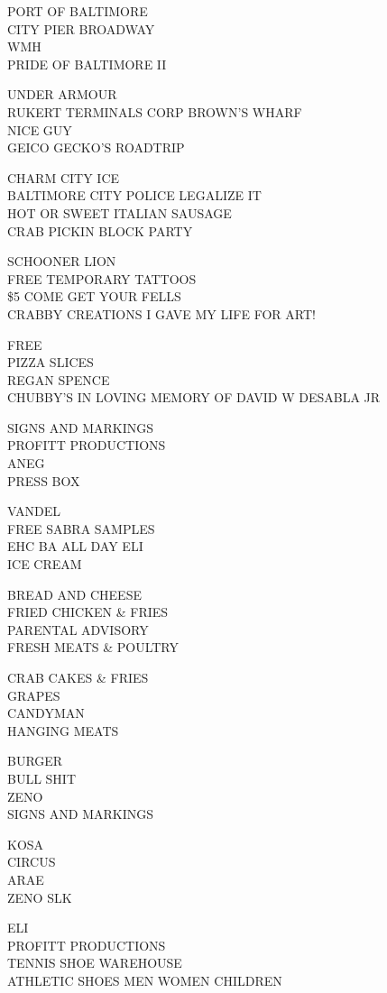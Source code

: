 \documentclass[10pt,letterpaper]{article}
\begin{document}
PORT OF BALTIMORE\\
CITY PIER BROADWAY\\
WMH\\
PRIDE OF BALTIMORE II

UNDER ARMOUR\\
RUKERT TERMINALS CORP BROWN'S WHARF\\
NICE GUY\\
GEICO GECKO'S ROADTRIP

CHARM CITY ICE\\
BALTIMORE CITY POLICE LEGALIZE IT\\
HOT OR SWEET ITALIAN SAUSAGE\\
CRAB PICKIN BLOCK PARTY

SCHOONER LION\\
FREE TEMPORARY TATTOOS\\
\$5 COME GET YOUR FELLS\\
CRABBY CREATIONS I GAVE MY LIFE FOR ART!

FREE\\
PIZZA SLICES\\
REGAN SPENCE\\
CHUBBY'S IN LOVING MEMORY OF DAVID W DESABLA JR

SIGNS AND MARKINGS\\
PROFITT PRODUCTIONS\\
ANEG\\
PRESS BOX

VANDEL\\
FREE SABRA SAMPLES\\
EHC BA ALL DAY ELI\\
ICE CREAM

BREAD AND CHEESE\\
FRIED CHICKEN \& FRIES\\
PARENTAL ADVISORY\\
FRESH MEATS \& POULTRY

CRAB CAKES \& FRIES\\
GRAPES\\
CANDYMAN\\
HANGING MEATS

BURGER\\
BULL SHIT\\
ZENO\\
SIGNS AND MARKINGS

KOSA\\
CIRCUS\\
ARAE\\
ZENO SLK

ELI\\
PROFITT PRODUCTIONS\\
TENNIS SHOE WAREHOUSE\\
ATHLETIC SHOES MEN WOMEN CHILDREN
\end{document}
